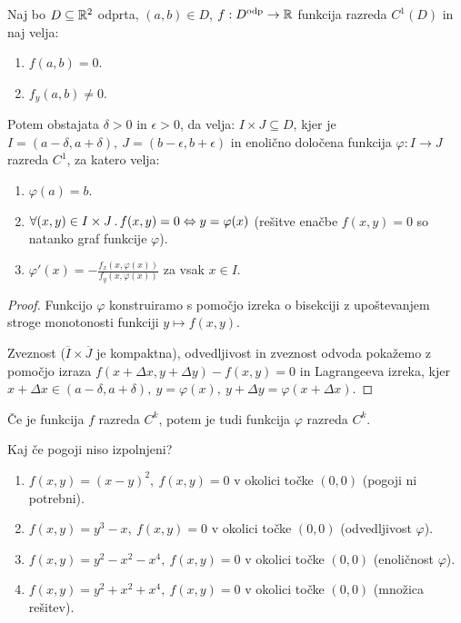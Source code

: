 \begin{izrek}
    Naj bo $D \subseteq \mathbb{R}^2$ odprta,  $(a, b) \in D$,  $f: D^\text{odp} \to \mathbb{R}$ funkcija razreda $ C^1(D)$ in naj velja:
    \begin{enumerate}
        \item $f(a,b) = 0$.
        \item $f_y(a,b) \neq 0$.
    \end{enumerate}
    Potem obstajata $\delta > 0$ in $\epsilon > 0$, da velja: $I \times J \subseteq D$, kjer je $I = (a - \delta, a + \delta), \ J = (b-\epsilon, b+\epsilon)$ in enolično določena funkcija $\varphi: I \to J$ razreda $C^1$, za katero velja:
    \begin{enumerate}
        \item $\varphi(a) = b$.
        \item $\forall (x,y) \in I \times J \,.\, f(x, y) = 0 \Leftrightarrow y = \varphi (x)$ (rešitve enačbe $f(x,y) = 0$ so natanko graf funkcije $\varphi$).
        \item $\varphi'(x) = -\frac{f_x(x, \varphi(x))}{f_y(x, \varphi(x))}$ za vsak $x \in I$.
    \end{enumerate}
\end{izrek}

\begin{proof}
    Funkcijo $\varphi$ konstruiramo s pomočjo izreka o bisekciji z upoštevanjem stroge monotonosti funkciji $y \mapsto f(x, y)$.

    Zveznost ($\overline{I} \times \overline{J}$ je kompaktna), odvedljivost in zveznost odvoda pokažemo z pomočjo izraza $f(x + \Delta x, y + \Delta y) - f(x,y) = 0$ in Lagrangeeva izreka, kjer $x + \Delta x \in (a - \delta, a + \delta), \ y= \varphi (x), \ y + \Delta y = \varphi(x + \Delta x)$.
\end{proof}

\begin{posledica}
    Če je funkcija $f$ razreda $C^k$, potem je tudi funkcija $\varphi$ razreda $C^k$.
\end{posledica}

\begin{zgled}
    Kaj če pogoji niso izpolnjeni?
    \begin{enumerate}
        \item $f(x,y) = (x-y)^2, \ f(x,y) = 0$ v okolici točke $(0,0)$ (pogoji ni potrebni).
        \item $f(x,y) = y^3 - x, \ f(x,y) = 0$ v okolici točke $(0,0)$ (odvedljivost $\varphi$).
        \item $f(x,y) = y^2-x^2-x^4, \ f(x,y) = 0$ v okolici točke $(0,0)$ (enoličnost $\varphi$).
        \item $f(x,y) = y^2+x^2+x^4, \ f(x,y) = 0$ v okolici točke $(0,0)$ (množica rešitev).
    \end{enumerate}
\end{zgled}


